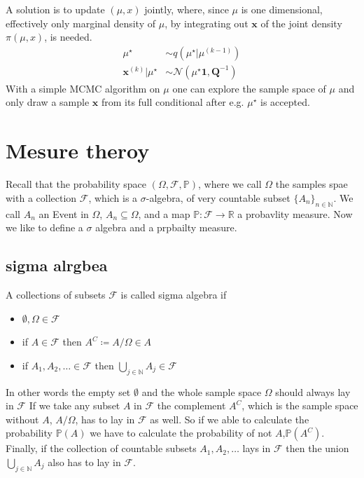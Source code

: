 A solution is to update $(\mu, x)$ jointly, where, since $\mu$ is one dimensional, effectively only marginal density of $\mu$, by integrating out $\bm{x}$  of the joint density $\pi(\mu, x)$, is needed.
\begin{align}
	\mu^{\star}  &\sim q (\mu^{\star}|	\mu^{(k-1)} ) \\
	\bm{x}^{(k)} | \mu^{\star} &\sim \mathcal{N} (	\mu^{\star}\bm{1}, \bm{Q}^{-1}) 
\end{align}
With a simple MCMC algorithm on $ \mu$ one can explore the sample space of $\mu$ and only draw a sample $\bm{x}$ from its full conditional after e.g.  $\mu^{\star}$ is accepted. 



\chapter{Mesure theroy}
\label{ch:Mesure}
Recall that the probability space $(\Omega, \mathcal{F} , \mathbb{P})$, where we call $\Omega$ the samples spae with a collection $\mathcal{F}$, which is a $\sigma $-algebra, of very countable subset $\{ A _n \}_{n\in \mathbb{N}}$.
We call $A_n$ an Event in $\Omega$, $A_n \subseteq  \Omega$, and a map $\mathbb{P} : \mathcal{F} \longrightarrow \mathbb{R}$ a probavlity measure.
Now we like to define a $\sigma$ algebra and a prpbailty measure.
\section{sigma alrgbea}
A collections of subsets $\mathcal{F}$ is called sigma algebra if
\begin{itemize}
	\item $\emptyset, \Omega \in \mathcal{F} $
	\item if $A \in \mathcal{F} $ then $A^C \coloneqq A / \Omega \in A$
	\item if $A_1 , A_2, \dots  \in \mathcal{F} $ then $ \bigcup_{j \in \mathbb{N}}  A_j \in  \mathcal{F}$
\end{itemize}
In other words the empty set $\emptyset$ and the whole sample space $ \Omega$ should always lay in $\mathcal{F}$ 
If we take any subset $A$ in $\mathcal{F}$ the complement  $A^C $, which is the sample space without $A$, $A / \Omega$, has to lay in $\mathcal{F}$ as well.
So if we able to calculate the probability $\mathbb{P}(A)$ we have to calculate the probability of not $A$,$ \mathbb{P}(A^C)$.
Finally, if the collection of countable subsets $A_1 , A_2, \dots $ lays in $\mathcal{F}$ then the union $\bigcup_{j \in \mathbb{N}}  A_j$ also has to lay in $\mathcal{F}$.

